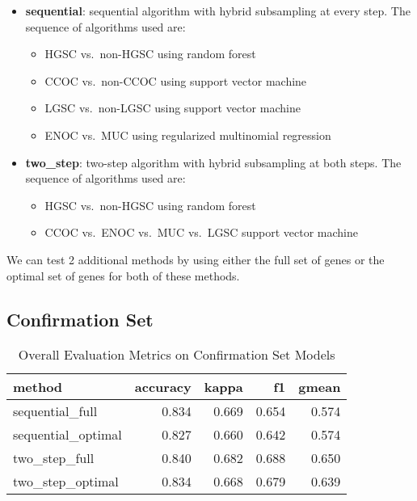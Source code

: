 \documentclass[
]{report}
\providecommand{\tightlist}{%
  \setlength{\itemsep}{0pt}\setlength{\parskip}{0pt}}
\begin{document}
\begin{itemize}
\tightlist
\item
  \textbf{sequential}: sequential algorithm with hybrid subsampling at every step. The sequence of algorithms used are:

  \begin{itemize}
  \tightlist
  \item
    HGSC vs.~non-HGSC using random forest
  \item
    CCOC vs.~non-CCOC using support vector machine
  \item
    LGSC vs.~non-LGSC using support vector machine
  \item
    ENOC vs.~MUC using regularized multinomial regression
  \end{itemize}
\item
  \textbf{two\_step}: two-step algorithm with hybrid subsampling at both steps. The sequence of algorithms used are:

  \begin{itemize}
  \tightlist
  \item
    HGSC vs.~non-HGSC using random forest
  \item
    CCOC vs.~ENOC vs.~MUC vs.~LGSC support vector machine
  \end{itemize}
\end{itemize}

We can test 2 additional methods by using either the full set of genes or the optimal set of genes for both of these methods.

\hypertarget{confirmation-set}{%
\subsection{Confirmation Set}\label{confirmation-set}}

\begin{table}

\caption{\label{tab:conf-eval-overall}Overall Evaluation Metrics on Confirmation Set Models}
\centering
\begin{tabular}[t]{l|r|r|r|r}
\hline
method & accuracy & kappa & f1 & gmean\\
\hline
sequential\_full & 0.834 & 0.669 & 0.654 & 0.574\\
\hline
sequential\_optimal & 0.827 & 0.660 & 0.642 & 0.574\\
\hline
two\_step\_full & 0.840 & 0.682 & 0.688 & 0.650\\
\hline
two\_step\_optimal & 0.834 & 0.668 & 0.679 & 0.639\\
\hline
\end{tabular}
\end{table}
\end{document}
